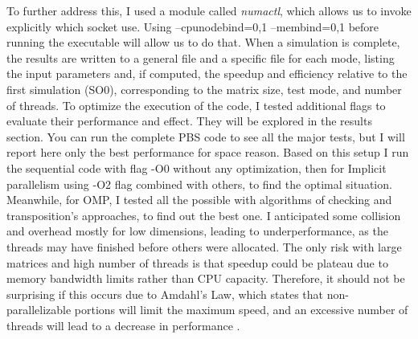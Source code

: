 To further address this, I used a module called \textit{numactl}, which allows us to invoke explicitly which socket use. Using --cpunodebind=0,1 --membind=0,1 before running the executable will allow us to do that. When a simulation is complete, the results are written to a general file and a specific file for each mode, listing the input parameters and, if computed, the speedup and efficiency relative to the first simulation (SO0), corresponding to the matrix size, test mode, and number of threads. To optimize the execution of the code, I tested additional flags to evaluate their performance and effect. They will be explored in the results section. You can run the complete PBS code to see all the major tests, but I will report here only the best performance for space reason. 
Based on this setup I run the sequential code with flag -O0 without any optimization, then for Implicit parallelism using -O2 flag combined with others, to find the optimal situation. Meanwhile, for OMP, I tested all the possible with algorithms of checking and transposition’s approaches, to find out the best one. I anticipated some collision and overhead mostly for low dimensions, leading to underperformance, as the threads may have finished before others were allocated. The only risk with large matrices and high number of threads is that speedup could be plateau due to memory bandwidth limits rather than CPU capacity. Therefore, it should not be surprising if this occurs due to Amdahl's Law, which states that non-parallelizable portions will limit the maximum speed, and an excessive number of threads will lead to a decrease in performance \cite{amdahls-law}.  
